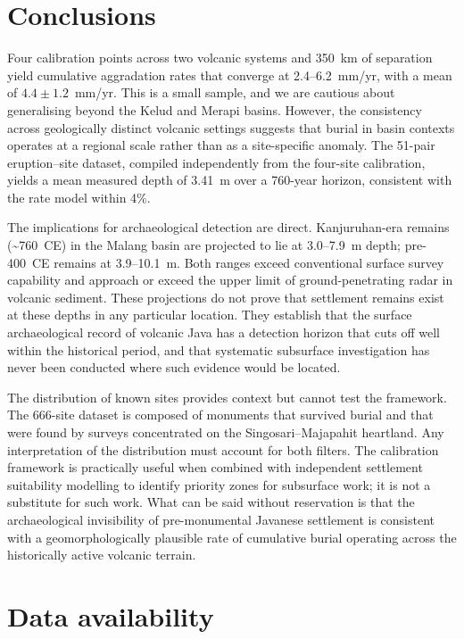 \documentclass[12pt,a4paper]{article}
\begin{document}
\section{Conclusions}

Four calibration points across two volcanic systems and 350~km of separation yield cumulative aggradation rates that converge at 2.4--6.2~mm/yr, with a mean of $4.4 \pm 1.2$~mm/yr. This is a small sample, and we are cautious about generalising beyond the Kelud and Merapi basins. However, the consistency across geologically distinct volcanic settings suggests that burial in basin contexts operates at a regional scale rather than as a site-specific anomaly. The 51-pair eruption--site dataset, compiled independently from the four-site calibration, yields a mean measured depth of 3.41~m over a 760-year horizon, consistent with the rate model within 4\%.

The implications for archaeological detection are direct. Kanjuruhan-era remains (\textasciitilde760~CE) in the Malang basin are projected to lie at 3.0--7.9~m depth; pre-400~CE remains at 3.9--10.1~m. Both ranges exceed conventional surface survey capability and approach or exceed the upper limit of ground-penetrating radar in volcanic sediment. These projections do not prove that settlement remains exist at these depths in any particular location. They establish that the surface archaeological record of volcanic Java has a detection horizon that cuts off well within the historical period, and that systematic subsurface investigation has never been conducted where such evidence would be located.

The distribution of known sites provides context but cannot test the framework. The 666-site dataset is composed of monuments that survived burial and that were found by surveys concentrated on the Singosari--Majapahit heartland. Any interpretation of the distribution must account for both filters. The calibration framework is practically useful when combined with independent settlement suitability modelling to identify priority zones for subsurface work; it is not a substitute for such work. What can be said without reservation is that the archaeological invisibility of pre-monumental Javanese settlement is consistent with a geomorphologically plausible rate of cumulative burial operating across the historically active volcanic terrain.


\section*{Data availability}
\end{document}
